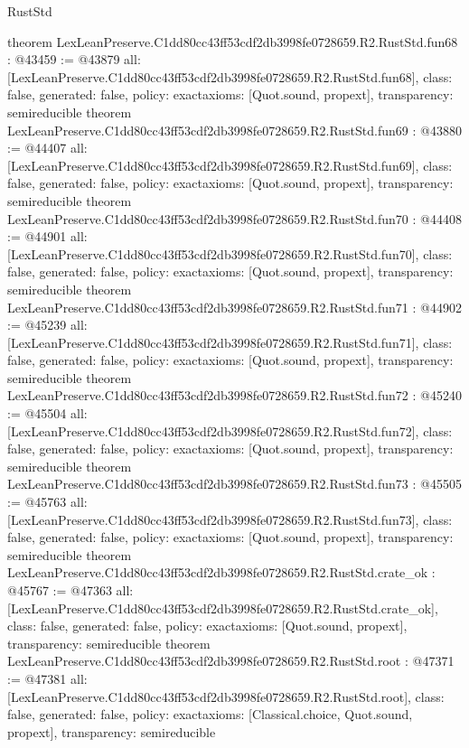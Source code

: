 \begin{lexlean}{RustStd}
\begin{coremodule}
{}
theorem LexLeanPreserve.C1dd80cc43ff53cdf2db3998fe0728659.R2.RustStd.fun68 : @43459 := @43879 {
  all: [LexLeanPreserve.C1dd80cc43ff53cdf2db3998fe0728659.R2.RustStd.fun68],
  class: false,
  generated: false,
  policy: exact{axioms: [Quot.sound, propext]},
  transparency: semireducible
}
theorem LexLeanPreserve.C1dd80cc43ff53cdf2db3998fe0728659.R2.RustStd.fun69 : @43880 := @44407 {
  all: [LexLeanPreserve.C1dd80cc43ff53cdf2db3998fe0728659.R2.RustStd.fun69],
  class: false,
  generated: false,
  policy: exact{axioms: [Quot.sound, propext]},
  transparency: semireducible
}
theorem LexLeanPreserve.C1dd80cc43ff53cdf2db3998fe0728659.R2.RustStd.fun70 : @44408 := @44901 {
  all: [LexLeanPreserve.C1dd80cc43ff53cdf2db3998fe0728659.R2.RustStd.fun70],
  class: false,
  generated: false,
  policy: exact{axioms: [Quot.sound, propext]},
  transparency: semireducible
}
theorem LexLeanPreserve.C1dd80cc43ff53cdf2db3998fe0728659.R2.RustStd.fun71 : @44902 := @45239 {
  all: [LexLeanPreserve.C1dd80cc43ff53cdf2db3998fe0728659.R2.RustStd.fun71],
  class: false,
  generated: false,
  policy: exact{axioms: [Quot.sound, propext]},
  transparency: semireducible
}
theorem LexLeanPreserve.C1dd80cc43ff53cdf2db3998fe0728659.R2.RustStd.fun72 : @45240 := @45504 {
  all: [LexLeanPreserve.C1dd80cc43ff53cdf2db3998fe0728659.R2.RustStd.fun72],
  class: false,
  generated: false,
  policy: exact{axioms: [Quot.sound, propext]},
  transparency: semireducible
}
theorem LexLeanPreserve.C1dd80cc43ff53cdf2db3998fe0728659.R2.RustStd.fun73 : @45505 := @45763 {
  all: [LexLeanPreserve.C1dd80cc43ff53cdf2db3998fe0728659.R2.RustStd.fun73],
  class: false,
  generated: false,
  policy: exact{axioms: [Quot.sound, propext]},
  transparency: semireducible
}
theorem LexLeanPreserve.C1dd80cc43ff53cdf2db3998fe0728659.R2.RustStd.crate_ok : @45767 := @47363 {
  all: [LexLeanPreserve.C1dd80cc43ff53cdf2db3998fe0728659.R2.RustStd.crate_ok],
  class: false,
  generated: false,
  policy: exact{axioms: [Quot.sound, propext]},
  transparency: semireducible
}
theorem LexLeanPreserve.C1dd80cc43ff53cdf2db3998fe0728659.R2.RustStd.root : @47371 := @47381 {
  all: [LexLeanPreserve.C1dd80cc43ff53cdf2db3998fe0728659.R2.RustStd.root],
  class: false,
  generated: false,
  policy: exact{axioms: [Classical.choice, Quot.sound, propext]},
  transparency: semireducible
}


\end{coremodule}
\end{lexlean}

